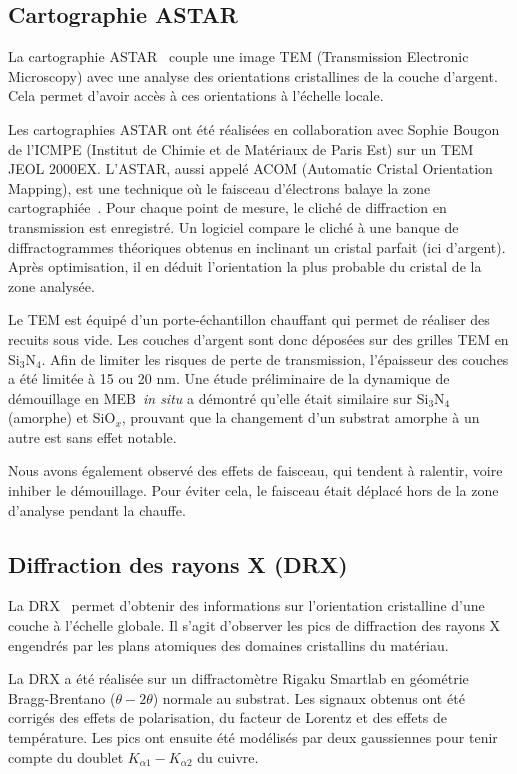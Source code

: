 	\subsection{Cartographie ASTAR}
\label{sAstar}
La cartographie ASTAR~\cite{rauch2008automatic} couple une image TEM (Transmission Electronic Microscopy) avec une analyse des orientations cristallines de la couche d'argent. Cela permet d'avoir accès à ces orientations à l'échelle locale.\par 
Les cartographies ASTAR ont été réalisées en collaboration avec Sophie Bougon de l'ICMPE (Institut de Chimie et de Matériaux de Paris Est) sur un TEM JEOL 2000EX. L'ASTAR, aussi appelé ACOM (Automatic Cristal Orientation Mapping), est une technique où le faisceau d'électrons balaye la zone cartographiée~\cite{rauch2008automatic}. Pour chaque point de mesure, le cliché de diffraction en transmission est enregistré. Un logiciel compare le cliché à une banque de diffractogrammes théoriques obtenus en inclinant un cristal parfait (ici d'argent). Après optimisation, il en déduit l'orientation la plus probable du cristal de la zone analysée.\par 
Le TEM est équipé d'un porte-échantillon chauffant qui permet de réaliser des recuits sous vide. Les couches d'argent sont donc déposées sur des grilles TEM en Si$_3$N$_4$. Afin de limiter les risques de perte de transmission, l'épaisseur des couches a été limitée à 15 ou 20 nm. Une étude préliminaire de la dynamique de démouillage en MEB~\textit{in situ} a démontré qu'elle était similaire sur Si$_3$N$_4$ (amorphe) et SiO$_x$, prouvant que la changement d'un substrat amorphe à un autre est sans effet notable.\par 
Nous avons également observé des effets de faisceau, qui tendent à ralentir, voire inhiber le démouillage. Pour éviter cela, le faisceau était déplacé hors de la zone d'analyse pendant la chauffe.\par 

	
	\subsection{Diffraction des rayons X (DRX)}
La DRX~\cite{warren1969x} permet d'obtenir des informations sur l'orientation cristalline d'une couche à l'échelle globale. Il s'agit d'observer les pics de diffraction des rayons X engendrés par les plans atomiques des domaines cristallins du matériau.\par 
La DRX a été réalisée sur un diffractomètre Rigaku Smartlab en géométrie Bragg-Brentano ($\theta-2\theta$) normale au substrat. Les signaux obtenus ont été corrigés des effets de polarisation, du facteur de Lorentz et des effets de température. Les pics ont ensuite été modélisés par deux gaussiennes pour tenir compte du doublet $K_{\alpha 1}-K_{\alpha 2}$ du cuivre.
